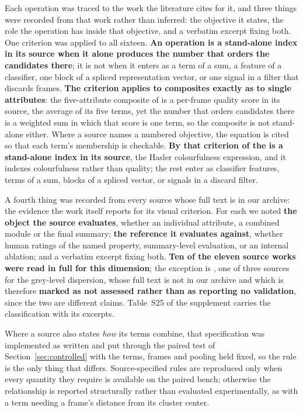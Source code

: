 Each operation was traced to the work the literature cites for it, and three things were
recorded from that work rather than inferred: the objective it states, the role the
operation has inside that objective, and a verbatim excerpt fixing both. One criterion was
applied to all sixteen. \textbf{An operation is a stand-alone index in its source when it
alone produces the number that orders the candidates there}; it is not when it enters as a
term of a sum, a feature of a classifier, one block of a spliced representation vector, or
one signal in a filter that discards frames.
\textbf{The criterion applies to composites exactly as to single attributes}: the
five-attribute composite of \citet{srinivas2016rank} is a per-frame quality score in its
source, the average of its five terms, yet the number that orders candidates there is a
weighted sum in which that score is one term, so the composite is not stand-alone either.
Where a source
names a numbered objective, the equation is cited so that each term's membership is
checkable. \textbf{By that criterion \autAutonomas{} of the \autVerificadas{} is a
stand-alone index in its source}, the Hasler colourfulness expression, and it indexes
colourfulness rather than quality; the rest enter as classifier features, terms of a sum,
blocks of a spliced vector, or signals in a discard filter.

A fourth thing was recorded from every source whose full text is in our archive: the
evidence the work itself reports for its visual criterion. For each we noted \textbf{the
object the source evaluates}, whether an individual attribute, a combined module or the
final summary; \textbf{the reference it evaluates against}, whether human ratings of the
named property, summary-level evaluation, or an internal ablation; and a verbatim
excerpt fixing both. \textbf{Ten of the eleven source works were read in full for this dimension}; the
exception is \citet{xu2024property}, one of three sources for the grey-level dispersion, whose full
text is not in our archive and which is therefore \textbf{marked as not assessed rather than
as reporting no validation}, since the two are different claims. Table~S25 of the supplement
carries the classification with its excerpts.

Where a source also states \emph{how} its terms combine, that specification was implemented
as written and put through the paired test of Section~\ref{sec:controlled} with the terms,
frames and pooling held fixed, so the rule is the only thing that differs. Source-specified rules are
reproduced only when every quantity they require is available on the paired bench;
otherwise the relationship is reported structurally rather than evaluated experimentally,
as with a term needing a frame's distance from its cluster center.

